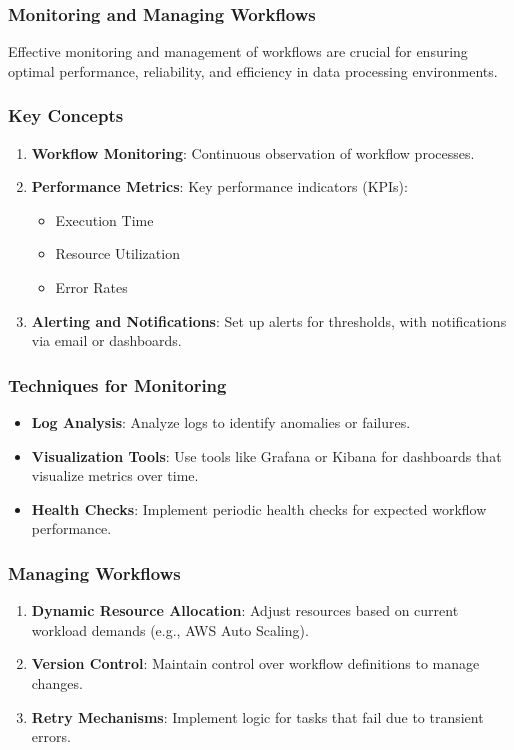 \documentclass[aspectratio=169]{beamer}
\begin{document}
\begin{frame}[fragile]
    \frametitle{Monitoring and Managing Workflows}
    Effective monitoring and management of workflows are crucial for ensuring optimal performance, reliability, and efficiency in data processing environments.
\end{frame}

\begin{frame}[fragile]
    \frametitle{Key Concepts}
    \begin{enumerate}
        \item \textbf{Workflow Monitoring}: Continuous observation of workflow processes.
        \item \textbf{Performance Metrics}: Key performance indicators (KPIs):
        \begin{itemize}
            \item Execution Time
            \item Resource Utilization
            \item Error Rates
        \end{itemize}
        \item \textbf{Alerting and Notifications}: Set up alerts for thresholds, with notifications via email or dashboards.
    \end{enumerate}
\end{frame}

\begin{frame}[fragile]
    \frametitle{Techniques for Monitoring}
    \begin{itemize}
        \item \textbf{Log Analysis}: Analyze logs to identify anomalies or failures.
        \item \textbf{Visualization Tools}: Use tools like Grafana or Kibana for dashboards that visualize metrics over time.
        \item \textbf{Health Checks}: Implement periodic health checks for expected workflow performance.
    \end{itemize}
\end{frame}

\begin{frame}[fragile]
    \frametitle{Managing Workflows}
    \begin{enumerate}
        \item \textbf{Dynamic Resource Allocation}: Adjust resources based on current workload demands (e.g., AWS Auto Scaling).
        \item \textbf{Version Control}: Maintain control over workflow definitions to manage changes.
        \item \textbf{Retry Mechanisms}: Implement logic for tasks that fail due to transient errors.
    \end{enumerate}
\end{frame}
\end{document}
